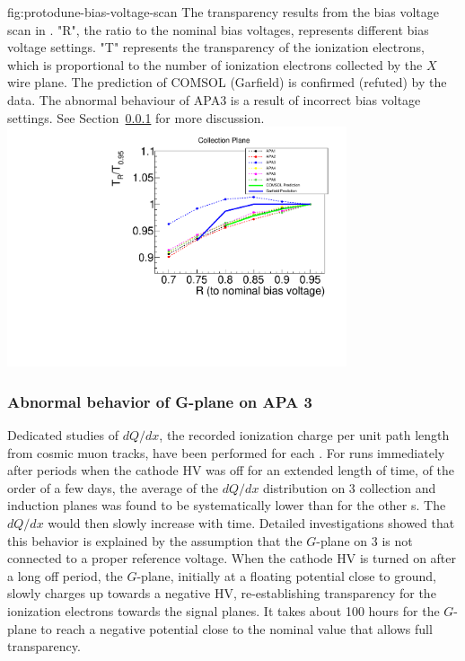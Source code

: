 \begin{dunefigure}{fig:protodune-bias-voltage-scan}
{The transparency results from the bias voltage scan in . "R", the ratio to the nominal bias voltages, represents different bias voltage settings. "T" represents the transparency of the ionization electrons, which is proportional to the number of ionization electrons collected by the $X$ wire plane. The prediction of COMSOL (Garfield) is confirmed (refuted) by the  data. The abnormal behaviour of APA3 is a result of incorrect bias voltage settings. See Section~\ref{sec:fdsp-apa-qa-g-plane} for more discussion.}
\includegraphics[width=0.75\textwidth]{graphics/protodune-bias_voltage_scan_group1.pdf}   
\end{dunefigure}

\subsubsection{Abnormal behavior of G-plane on APA 3}
\label{sec:fdsp-apa-qa-g-plane}

Dedicated studies of $dQ/dx$, the recorded ionization charge per unit path length from cosmic muon tracks, have been performed for each . For runs immediately after periods when the cathode HV was off for an extended length of time, of the order of a few days, the average of the $dQ/dx$ distribution on  3 collection and induction planes was found to be systematically lower than for the other s.  The $dQ/dx$ would then slowly increase with time.  Detailed investigations showed that this behavior is explained by the assumption that the $G$-plane on  3 is not connected to a proper reference voltage. When the cathode HV is turned on after a long off period, the $G$-plane, initially at a floating potential close to ground, slowly charges up towards a negative HV,  re-establishing transparency for the ionization electrons towards the signal planes. It takes about 100 hours for the $G$-plane to reach a negative potential close to the nominal value that allows full transparency.


